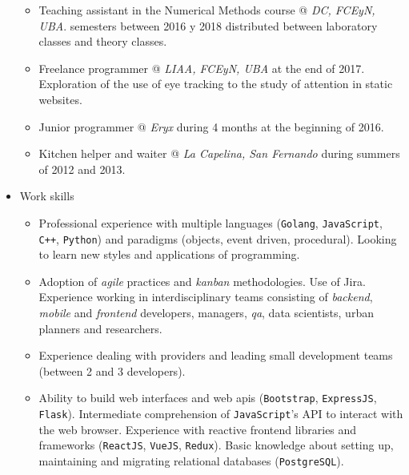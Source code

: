 \documentclass[a4paper]{article}
\begin{document}
\begin{itemize}
\begin{itemize}
    \item
      Teaching assistant in the Numerical Methods course @ \textit{DC, FCEyN,
      UBA}.   semesters between 2016 y 2018 distributed between laboratory classes
      and theory classes.

    \item
      Freelance programmer @ \textit{LIAA, FCEyN, UBA} at the end of 2017.
      \newline
      Exploration of the use of eye tracking to the study of attention in
      static websites.

    \item
      Junior programmer @ \textit{Eryx} during 4 months at the beginning of
      2016.

    \item
      Kitchen helper and waiter @ \textit{La Capelina, San Fernando} during
      summers of 2012 and 2013.

  \end{itemize}

  \item Work skills
  \begin{itemize}

    \item
      Professional experience with multiple languages (\texttt{Golang},
      \texttt{JavaScript}, \texttt{C}\verb|++|, \texttt{Python}) and paradigms
      (objects, event driven, procedural). \newline
      Looking to learn new styles and applications of programming.

    \item
      Adoption of \textit{agile} practices and \textit{kanban} methodologies.
      Use of Jira. \newline
      Experience working in interdisciplinary teams consisting of
      \textit{backend}, \textit{mobile} and \textit{frontend} developers,
      managers, \textit{qa}, data scientists, urban planners and researchers.

	\item
	  Experience dealing with providers and leading small development teams
	  (between 2 and 3 developers).

    \item
      Ability to build web interfaces and web apis (\texttt{Bootstrap},
      \texttt{ExpressJS}, \texttt{Flask}). \newline
      Intermediate comprehension of \texttt{JavaScript}'s API to interact with
      the web browser. \newline
      Experience with reactive frontend libraries and frameworks
      (\texttt{ReactJS}, \texttt{VueJS}, \texttt{Redux}). \newline
      Basic knowledge about setting up, maintaining and migrating relational
      databases (\texttt{PostgreSQL}).


\end{itemize}
\end{itemize}
\end{document}
